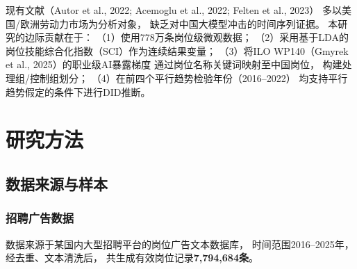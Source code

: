 \documentclass[12pt,a4paper]{ctexart}
\begin{document}
现有文献（Autor et al., 2022; Acemoglu et al., 2022; Felten et al., 2023）
多以美国/欧洲劳动力市场为分析对象，
缺乏对中国大模型冲击的时间序列证据。
本研究的边际贡献在于：
（1）使用778万条岗位级微观数据；
（2）采用基于LDA的岗位技能综合化指数（SCI）作为连续结果变量；
（3）将ILO WP140（Gmyrek et al., 2025）的职业级AI暴露梯度
通过岗位名称关键词映射至中国岗位，
构建处理组/控制组划分；
（4）在前四个平行趋势检验年份（2016--2022）
均支持平行趋势假定的条件下进行DID推断。

\section{研究方法}

\subsection{数据来源与样本}

\subsubsection{招聘广告数据}

数据来源于某国内大型招聘平台的岗位广告文本数据库，
时间范围2016--2025年，经去重、文本清洗后，
共生成有效岗位记录\textbf{7,794,684条}。
\end{document}
